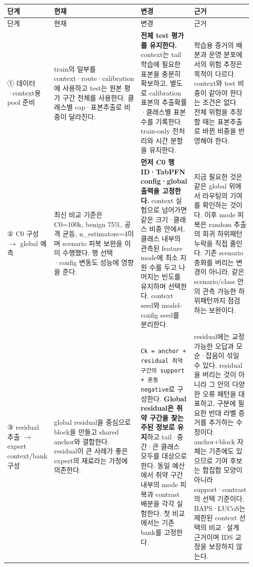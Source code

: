 \begingroup
\footnotesize
\begin{longtable}{>{\raggedright\arraybackslash}p{}>{\raggedright\arraybackslash}p{}>{\raggedright\arraybackslash}p{}>{\raggedright\arraybackslash}p{}}
\toprule
단계 & 현재 & 변경 & 근거 \\ \midrule
\endfirsthead
단계 & 현재 & 변경 & 근거 \\ \midrule
\endhead
{}① 데이터·context용 pool 준비 & train의 일부를 context·route·calibration에 사용하고 test는 원본 평가 구간 전체를 사용한다. 클래스별 cap·표본추출로 비중이 달라진다. & \textbf{전체 test 평가를 유지한다.} context는 tail 학습에 필요한 표본을 충분히 확보하고, 별도로 calibration 표본의 추출확률·클래스별 표본 수를 기록한다. train-only 전처리와 시간 분할을 유지한다. & 학습용 증거의 배분과 운영 분포에서의 위험 추정은 목적이 다르다. context와 test 비중이 같아야 한다는 조건은 없다. 전체 위험을 추정할 때는 표본추출로 바뀐 비중을 반영해야 한다. \\
{}② C0 구성  \ensuremath{\rightarrow}  global 예측 & 최신 비교 기준은 C0=\allowbreak{}100k, benign 75\%, 공격 균등, n\_\allowbreak{}estimators=\allowbreak{}4이며 scenario 피복 보완을 이미 수행했다. 행 선택·config 변동도 성능에 영향을 준다. & \textbf{먼저 C0 행 ID·TabPFN config·global 출력을 고정한다.} context 실험으로 넘어가면 같은 크기·클래스 비중 안에서, 클래스 내부의 관측된 feature mode에 최소 지원 수를 두고 나머지는 빈도를 유지하며 선택한다. context seed와 model-config seed를 분리한다. & 지금 필요한 것은 같은 global 위에서 라우팅의 기여를 확인하는 것이다. 이후 mode 피복은 random 추출의 희귀 하위패턴 누락을 직접 줄인다. 기존 scenario 층화를 버리는 변경이 아니라, 같은 scenario/\allowbreak{}class 안의 관측 가능한 하위패턴까지 점검하는 보완이다. \\
{}③ residual 추출  \ensuremath{\rightarrow}  expert context/\allowbreak{}bank 구성 & global residual을 중심으로 block을 만들고 shared anchor와 결합한다. residual이 큰 사례가 좋은 expert의 재료라는 가정에 의존한다. & \texttt{Ck =\allowbreak{}\allowbreak{} anc\allowbreak{}hor +\allowbreak{}\allowbreak{} re\allowbreak{}sidual 취\allowbreak{}약 구간의 su\allowbreak{}pport +\allowbreak{}\allowbreak{} \allowbreak{}혼동 negat\allowbreak{}ive}로 구성한다. \textbf{Global residual은 취약 구간을 찾는 주된 정보로 유지}하고 tail·중간·큰 클래스 모두를 대상으로 한다. 동일 예산에서 취약 구간 내부의 mode 피복과 contrast 배분을 각각 실험한다. 첫 비교에서는 기존 bank를 고정한다. & residual에는 교정 가능한 오답과 모순·잡음이 섞일 수 있다. residual을 버리는 것이 아니라 그 안의 다양한 오류 패턴을 대표하고, 구분에 필요한 반대 라벨 증거를 추가하는 수정이다. anchor+\allowbreak{}block 자체는 기존에도 있으므로 기여 후보는 합집합 모양이 아니라 support·contrast의 선택 기준이다. BAPS·LUCoS는 제한된 context 선택의 비교·설계 근거이며 IDS 교정을 보장하지 않는다. \\

\end{longtable}
